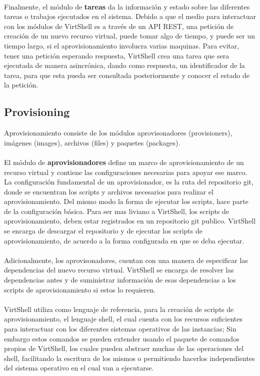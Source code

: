 \\
Finalmente, el módulo de \textbf{tareas} da la información y estado sobre las diferentes tareas o trabajos ejecutados en el sistema. Debido a que el medio para interactuar con los módulos de VirtShell es a través de un API REST, una petición de creación de un nuevo recurso virtual, puede tomar algo de tiempo, y puede ser un tiempo largo, si el aprovisionamiento involucra varias maquinas. Para evitar, tener una petición esperando respuesta, VirtShell crea una tarea que sera ejecutada de manera asincrónica, dando como respuesta, un identificador de la tarea, para que esta pueda ser consultada posteriormente y conocer el estado de la petición.


\subsection{Provisioning}
Aprovisionamiento consiste de los módulos aprovisonadores (provisioners), imágenes (images), archivos (files) y paquetes (packages).\\
\\
El módulo de \textbf{aprovisionadores} define un marco de aprovisionamiento de un recurso virtual y contiene las configuraciones necesarias para apoyar ese marco. La configuración fundamental de un aprovisionador, es la ruta del repositorio git, donde se encuentran los scripts y archivos necesarios para realizar el aprovisionamiento. Del mismo modo la forma de ejecutar los scripts, hace parte de la configuración básica. Para ser mas liviano a VirtShell, los scripts de aprovisionamiento, deben estar registrados en un repositorio git publico. VirtShell se encarga de descargar el repositorio y de ejecutar los scripts de aprovisionamiento, de acuerdo a la forma configurada en que se deba ejecutar. \\
\\
Adicionalmente, los aprovisonadores, cuentan con una manera de especificar las dependencias del nuevo recurso virtual. VirtShell se encarga de resolver las dependencias antes y de suministrar información de esas dependencias a los scripts de aprovisionamiento si estos lo requieren. \\
\\
VirtShell utiliza como lenguaje de referencia, para la creación de scripts de aprovisionamiento, el lenguaje shell, el cual cuenta con los recursos suficientes para interactuar con los diferentes sistemas operativos de las instancias; Sin embargo estos comandos se pueden extender usando el paquete de comandos propios de VirtShell, los cuales pueden abstraer muchas de las operaciones del shell, facilitando la escritura de los mismos o permitiendo hacerlos independientes del sistema operativo en el cual van a ejecutarse.\\
